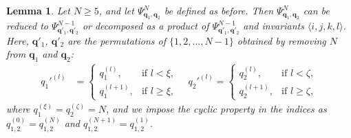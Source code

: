 \documentclass[10pt,a4paper]{amsart}
\newtheorem{lemma}{Lemma}
\begin{document}
\begin{lemma}
\label{lem:decomposition}
    Let $N \geq 5$, and let $\Psi^N_{\bm{q}_1, \bm{q}_2}$ be defined as before. Then $\Psi^N_{\bm{q}_1, \bm{q}_2}$ can be reduced to $\Psi^{N-1}_{\bm{q}'_1, \bm{q}'_2}$ or decomposed as a product of $\Psi^{N-1}_{\bm{q}'_1, \bm{q}'_2}$ and invariants $\langle  i,j,k,l\rangle$.
    Here,    
    $\bm{q}'_1$, $\bm{q}'_2$ are the permutations of $\{1,2,\ldots,N-1\}$ obtained by removing $N$ 
    from $\bm{q}_1$ and $\bm{q}_2$:
    \begin{align}
        q_1'^{(l)} &=
        \begin{cases}
            q_1^{(l)}, & \text{if } l < \xi, \\
            q_1^{(l+1)}, & \text{if } l \geq \xi,
        \end{cases} \quad
        q_2'^{(l)} =
        \begin{cases}
            q_2^{(l)}, & \text{if } l < \zeta, \\
            q_2^{(l+1)}, & \text{if } l \geq \zeta,
        \end{cases}
    \end{align}
    where $q_1^{(\xi)} = q_2^{(\zeta)} = N$, and we impose the cyclic property in the indices as $q_{1,2}^{(0)}=q_{1,2}^{(N)}$ and $q_{1,2}^{(N+1)}=q_{1,2}^{(1)}$.
\end{lemma}
\end{document}
